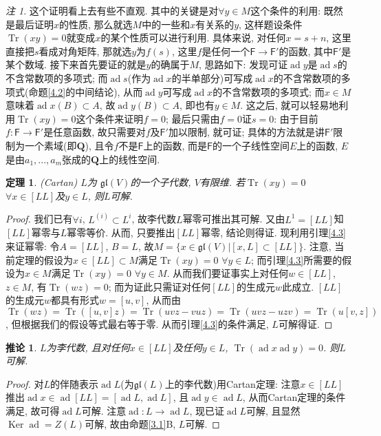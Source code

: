 \documentclass{ctexart}%
\newtheorem{theorem}{定理}
\newtheorem{corollary}{推论}
\theoremstyle{definition}
\theoremstyle{remark}
\newtheorem{remark}{注}
\DeclareMathOperator{\ad}{ad}
\DeclareMathOperator{\Tr}{Tr}
\DeclareMathOperator{\Ker}{Ker}
\begin{document}
\begin{remark}
这个证明看上去有些不直观. 其中的关键是对$\forall y\in M$这个条件的利用: 既然是最后证明$x$的性质, 那么就选$M$中的一些和$x$有关系的$y$, 这样题设条件$\Tr(xy)=0$就变成$x$的某个性质可以进行利用. 具体来说, 对任何$x=s+n$, 这里直接把$s$看成对角矩阵, 那就选$y$为$f(s)$, 这里$f$是任何一个$\mathsf{F}\rightarrow \mathsf{F}'$的函数, 其中$\mathsf{F}'$是某个数域. 接下来首先要证的就是$y$的确属于$M$, 思路如下: 发现可证$\ad y$是$\ad s$的不含常数项的多项式; 而$\ad s$(作为$\ad x$的半单部分)可写成$\ad x$的不含常数项的多项式(命题\ref{4.2}的中间结论), 从而$\ad y$可写成$\ad x$的不含常数项的多项式; 而$x\in M$意味着$\ad x (B)\subset A$, 故$\ad y(B)\subset A$, 即也有$y\in M$. 这之后, 就可以轻易地利用$\Tr(xy)=0$这个条件来证明$f=0$; 最后只需由$f=0$证$s=0$: 由于目前$f\colon \mathsf{F}\rightarrow \mathsf{F}'$是任意函数, 故只需要对$f$及$\mathsf{F}'$加以限制, 就可证; 具体的方法就是讲$\mathsf{F}'$限制为一个素域(即$\mathbf{Q}$), 且令$f$不是$\mathsf{F}$上的函数, 而是$\mathsf{F}$的一个子线性空间$E$上的函数, $E$是由$a_1,...,a_m$张成的$\mathbf{Q}$上的线性空间. 
\end{remark}
\begin{theorem}(Cartan) $L$为 $\mathfrak{gl}(V)$的一个子代数, $V$有限维. 若$\Tr(xy)=0$ $\forall x\in[LL]$及$y\in L$, 则$L$可解.
\end{theorem}
\begin{proof}
我们已有$\forall i$, $L^{(i)}\subset L^i$, 故李代数$L$幂零可推出其可解. 又由$L^1=[LL]$知$[LL]$幂零与$L$幂零等价. 从而, 只要推出$[LL]$幂零, 结论则得证. 现利用引理\ref{4.3}来证幂零: 令$A=[LL]$, $B=L$, 故$M=\{x\in \mathfrak{gl}(V)|[x,L]\subset [LL]\}$. 注意, 当前定理的假设为$x\in [LL]\subset M$满足$\Tr(xy)=0$ $\forall y\in L$; 而引理\ref{4.3}所需要的假设为$x\in M$满足$\Tr(xy)=0$ $\forall y\in M$. 从而我们要证事实上对任何$w\in [LL]$, $z\in M$, 有$\Tr(wz)=0$; 而为证此只需证对任何$[LL]$的生成元$w$此成立. $[LL]$的生成元$w$都具有形式$w=[u,v]$, 从而由$\Tr(wz)=\Tr([u,v]z)=\Tr(uvz-vuz)=\Tr(uvz-uzv)=\Tr(u[v,z])$, 但根据我们的假设等式最右等于零. 从而引理\ref{4.3}的条件满足, $L$可解得证.
\end{proof}

\begin{corollary}$L$为李代数, 且对任何$x\in [LL]$及任何$y\in L$, $\Tr(\ad x \ad y)=0$. 则$L$可解.
\end{corollary}
\begin{proof}
对$L$的伴随表示$\ad L$(为$\mathfrak{gl}(L)$上的李代数)用Cartan定理: 注意$x\in [LL]$推出$\ad x \in \ad [LL]=[\ad L, \ad L]$, 且$\ad y\in \ad L$, 从而Cartan定理的条件满足, 故可得$\ad L$可解. 注意$\ad\colon L\rightarrow \ad L$, 现已证$\ad L$可解, 且显然$\Ker \ad = Z(L)$可解, 故由命题\ref{3.1}B, $L$可解.
\end{proof}
\end{document}
